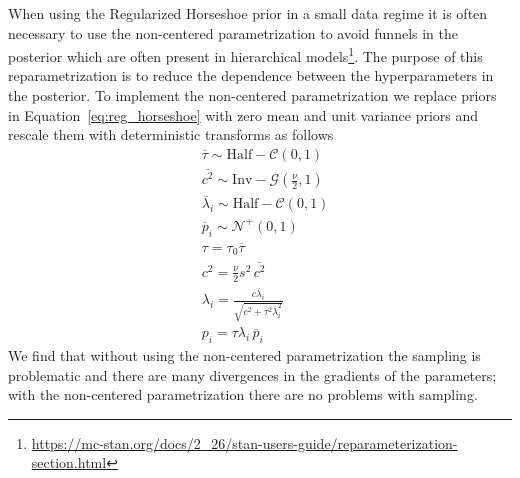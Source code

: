 \documentclass[modern]{aastex62}
\begin{document}
When using the Regularized Horseshoe prior in a small data regime it is often necessary to use the non-centered parametrization to avoid funnels in the posterior which are often present in hierarchical models\footnote{\url{https://mc-stan.org/docs/2_26/stan-users-guide/reparameterization-section.html}}.
The purpose of this reparametrization is to reduce the dependence between the hyperparameters in the posterior.
To implement the non-centered parametrization we replace priors in Equation~\ref{eq:reg_horseshoe} with zero mean and unit variance priors and rescale them with deterministic transforms as follows
\begin{equation}
\begin{aligned}
    &\overline{\tau} \sim \mathrm{Half}-\mathcal{C}\left(0, 1\right)\\
    &\overline{c^{2}}  \sim \mathrm{Inv}-\mathcal{G}\left(\frac{\nu}{2}, 1\right) \\
    &\overline{\lambda}_{i}  \sim \mathrm{Half}-\mathcal{C}(0,1) \\
    &\overline{p}_{i}  \sim \mathcal{N}^+\left(0, 1\right)\\
    &\tau=\tau_0\overline{\tau}\\
    &c^2=\frac{\nu}{2}s^2\,\overline{c^2}\\
    &\lambda_{i} =\frac{c \overline{\lambda}_{i}}{\sqrt{c^{2}+\tau^{2} \overline{\lambda}_{i}^{2}}} \\
    &p_i = \tau\lambda_i\,\overline{p}_i
\end{aligned}
    \label{eq:reg_horseshoe_noncentered}
\end{equation}
We find that without using the non-centered parametrization the sampling is problematic and there are many divergences in the gradients of the parameters; with the non-centered parametrization there are no problems with sampling.

\clearpage
\end{document}
